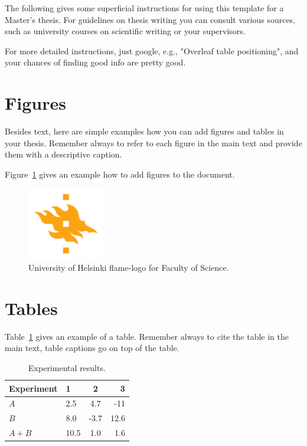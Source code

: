 The following gives some superficial instructions for using this template for a Master's thesis. For guidelines on thesis writing you can consult various sources, such as university courses on scientific writing or your supervisors.

For more detailed instructions, just google, e.g., "Overleaf table positioning", and your chances of finding good info are pretty good.  


\section{Figures}
Besides text, here are simple examples how you can add figures and tables in your thesis.
Remember always to refer to each figure in the main text and provide them with a descriptive caption.

Figure~\ref{fig:logo} gives an example how to add figures to the document. 

\begin{figure}[ht] 
\begin{center}
\includegraphics[width=0.3\textwidth]{template/figures/HY-logo-ml.png}
\caption{University of Helsinki flame-logo for Faculty of Science.\label{fig:logo}}
\end{center}
\end{figure}

\section{Tables}

Table~\ref{table:results} gives an example of a table.
Remember always to cite the table in the main text, table captions go on top of the table. 

\begin{table}[h] %
\begin{center}
\caption{Experimental results.\label{table:results}} %
\begin{tabular}{l||l c r} 
Experiment & 1 & 2 & 3 \\ 
\hline \hline 
$A$ & 2.5 & 4.7 & -11 \\
$B$ & 8.0 & -3.7 & 12.6 \\
$A+B$ & 10.5 & 1.0 & 1.6 \\
\hline
%
\end{tabular}
\end{center}
\end{table}


